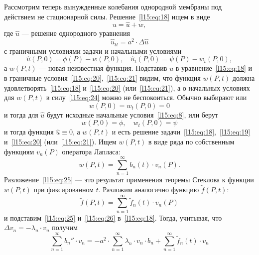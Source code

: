 Рассмотрим теперь вынужденные колебания однородной мембраны под действием не стационарной силы. Решение~\eqref{l15:eq:18} ищем в виде
\begin{equation*}
	 u=\widehat{u}+w,
\end{equation*}
где $\widehat{u}$ --- решение однородного уравнения
\begin{equation*}
	 \widehat{u}_{tt}=a^2\cdot\Delta\widehat{u}
\end{equation*}
с граничными условиями задачи и начальными условиями 
\begin{equation}\label{l15:eq:24}
	\widehat{u}(P,0)=\phi(P)-w(P,0),\quad \widehat{u}_t(P,0)=\psi(P)-w_t(P,0),
\end{equation}
а $w(P,t)$ --- новая неизвестная функция. Подставив $u$ в уравнение~\eqref{l15:eq:18} и в граничные условия~\eqref{l15:eq:20},~\eqref{l15:eq:21} видим, что функция $w(P,t)$ должна удовлетворять~\eqref{l15:eq:18} и~\eqref{l15:eq:20} (или~\eqref{l15:eq:21}), а о начальных условиях для $w(P,t)$ в силу~\eqref{l15:eq:24} можно не беспокоиться. Обычно выбирают или
\begin{equation*}
	 w(P,0)=w_t(P,0)=0
\end{equation*} 
и тогда для $\widehat{u}$ будут исходные начальные условия~\eqref{l15:eq:8}, или берут 
\begin{equation*}
	 w(P,0)=\phi,\quad w_t(P,0)=\psi
\end{equation*} 
и тогда функция $\widehat{u}\equiv0$, а $w(P,t)$ и есть решение задачи~\eqref{l15:eq:18},~\eqref{l15:eq:19} и~\eqref{l15:eq:20} (или~\eqref{l15:eq:21}). Ищем $w(P,t)$ в виде ряда по собственным функциям $v_n(P)$ оператора Лапласа:
\begin{equation}\label{l15:eq:25}
	 w(P,t)=\sum\limits_{n=1}^{\infty}b_n(t)\cdot v_n(P).
\end{equation}
Разложение~\eqref{l15:eq:25} --- это результат применения теоремы Стеклова к функции $w(P,t)$ при фиксированном $t$. Разложим аналогично функцию $\widetilde{f}(P,t)$:
\begin{equation}\label{l15:eq:26}
	\widetilde{f}(P,t)=\sum\limits_{n=1}^{\infty}\widetilde{f}_n(t)\cdot v_n(P)
\end{equation}
и подставим~\eqref{l15:eq:25} и~\eqref{l15:eq:26} в~\eqref{l15:eq:18}. Тогда, учитывая, что $\Delta v_n=-\lambda_n\cdot v_n$ получим 
\begin{equation*}
	\sum\limits_{n=1}^{\infty}b_n''\cdot v_n=-a^2\cdot\sum\limits_{n=1}^{\infty}\lambda_n\cdot v_n\cdot b_n+\sum\limits_{n=1}^{\infty}\widetilde{f}_n(t)\cdot v_n
\end{equation*}
